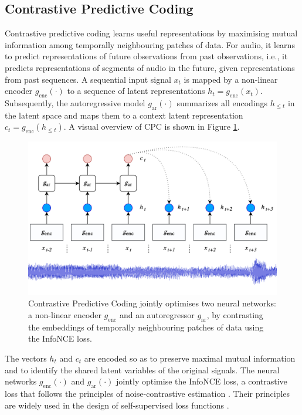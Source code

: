\subsection{Contrastive Predictive Coding}\label{sec:cpc}
Contrastive predictive coding learns useful representations by maximising mutual information among temporally neighbouring patches of data.
For audio, it learns to predict representations of future observations from past observations, i.e., it predicts representations of segments of audio in the future, given representations from past sequences.
A sequential input signal $x_t$ is mapped by a non-linear encoder $g_{\mathrm{enc}}(\cdot)$ to a sequence of latent representations $h_t = g_{\mathrm{enc}}(x_t)$. Subsequently, the autoregressive model $g_{\mathrm{ar}}(\cdot)$ summarizes all encodings $h_{\leq t}$ in the latent space and maps them to a context latent representation $c_t = g_{\mathrm{enc}}(h_{\leq t})$. A visual overview of CPC is shown in Figure \ref{fig:cpc_model}.


\begin{figure}
    \includegraphics[width=\textwidth]{figs/cpc_model.png}
    \caption{Contrastive Predictive Coding jointly optimises two neural networks: a non-linear encoder $g_{\mathrm{enc}}$ and an autoregressor $g_{\mathrm{ar}}$, by contrasting the embeddings of temporally neighbouring patches of data using the InfoNCE loss.}
    \label{fig:cpc_model}
\end{figure}

The vectors $h_t$ and $c_t$ are encoded so as to preserve maximal mutual information and to identify the shared latent variables of the original signals. The neural networks $g_{\mathrm{enc}}(\cdot)$ and $g_{\mathrm{ar}}(\cdot)$ jointly optimise the InfoNCE loss, a contrastive loss that follows the principles of noise-contrastive estimation \cite{gutmann_noise-contrastive_nodate}. Their principles are widely used in the design of self-supervised loss functions \cite{oord_representation_2019, sohn2020fixmatch, chen_simple_2020}.

